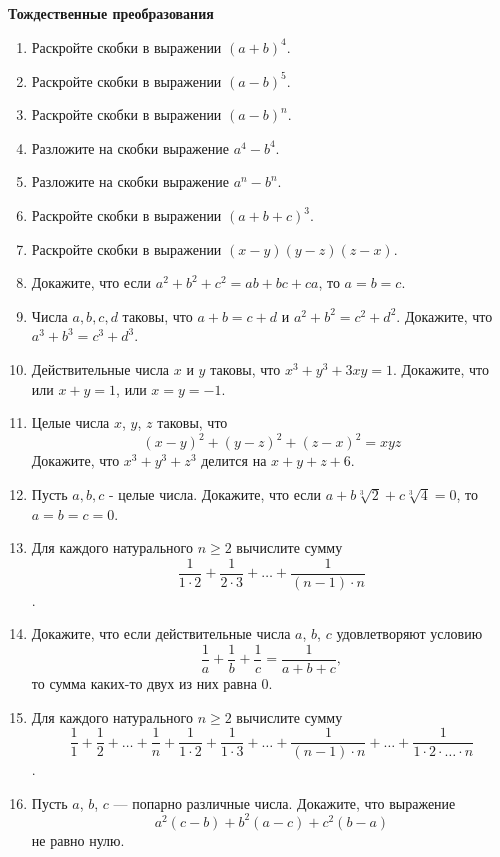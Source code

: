 \documentclass{article}
\begin{document}
\large
	
	
	\begin{center}
		\textbf{Тождественные преобразования}
	\end{center}

\begin{enumerate}[label*=\protect\fbox{\arabic{enumi}}]

\item Раскройте скобки в выражении $(a + b)^4$.

\item Раскройте скобки в выражении $(a - b)^5$.

\item Раскройте скобки в выражении $(a - b)^n$.

\item Разложите на скобки выражение $a^4- b^4$.

\item Разложите на скобки выражение $a^n- b^n$.

\item Раскройте скобки в выражении $(a + b + c)^3$.

\item Раскройте скобки в выражении $(x-y)(y-z)(z-x)$.

\item Докажите, что если $a^2 + b^2 + c^2 = ab + bc + ca$, то $a = b = c$.

\item Числа $a, b, c, d$ таковы, что $a + b = c + d$ и $a^2 + b^2 = c^2 + d^2$. Докажите, что $a^3 + b^3 = c^3 + d^3$.

\item Действительные числа $x$ и $y$ таковы, что $x^3 + y^3 + 3xy = 1$. Докажите, что или $x + y = 1$, или $x = y = -1$.

\item Целые числа $x$, $y$, $z$ таковы, что $$(x-y)^2 + (y-z)^2 + (z-x)^2 = xyz$$
Докажите, что $x^3 + y^3 + z^3$ делится на $x + y + z + 6$.

\item Пусть $a, b, c$ - целые числа. Докажите, что если $a + b \sqrt[3]{2} + c \sqrt[3]{4} = 0$, то $a = b = c = 0$.

\item Для каждого натурального $n \ge 2$ вычислите сумму $$ \dfrac{1}{1 \cdot 2} + \dfrac{1}{2 \cdot 3} + \dotso +  \dfrac{1}{(n-1) \cdot n}$$.

\item Докажите, что если действительные числа $a$, $b$, $c$ удовлетворяют условию $$\dfrac{1}{a} + \dfrac{1}{b} + \dfrac{1}{c} = \dfrac{1}{a + b + c},$$ то сумма каких-то двух из них равна 0.

\item Для каждого натурального $n \ge 2$ вычислите сумму $$\dfrac{1}{1} + \dfrac{1}{2} + \dotso +  \dfrac{1}{n} + \dfrac{1}{1 \cdot 2} + \dfrac{1}{1 \cdot 3} + \dotso +  \dfrac{1}{(n-1) \cdot n} + \dotso + \dfrac{1}{1 \cdot 2 \cdot \dotso \cdot n}$$.

\item Пусть $a$, $b$, $c$ — попарно различные числа. Докажите, что выражение $$a^2 (c-b)+b^2 (a-c)+c^2 (b-a)$$
не равно нулю.

\end{enumerate}
\end{document}
